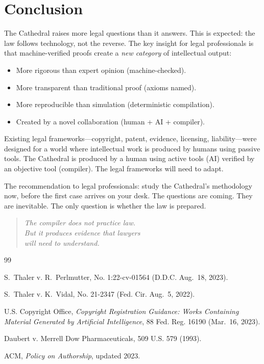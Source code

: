 \documentclass[11pt,a4paper]{article}
\begin{document}
\section{Conclusion}

The Cathedral raises more legal questions than it answers. This is
expected: the law follows technology, not the reverse. The key
insight for legal professionals is that machine-verified proofs
create a \emph{new category} of intellectual output:

\begin{itemize}
  \item More rigorous than expert opinion (machine-checked).
  \item More transparent than traditional proof (axioms named).
  \item More reproducible than simulation (deterministic compilation).
  \item Created by a novel collaboration (human + AI + compiler).
\end{itemize}

Existing legal frameworks---copyright, patent, evidence,
licensing, liability---were designed for a world where intellectual
work is produced by humans using passive tools. The Cathedral is
produced by a human using active tools (AI) verified by an
objective tool (compiler). The legal frameworks will need to adapt.

The recommendation to legal professionals: study the Cathedral's
methodology now, before the first case arrives on your desk.
The questions are coming. They are inevitable. The only question
is whether the law is prepared.

\begin{quote}
\emph{The compiler does not practice law.\\
But it produces evidence that lawyers\\
will need to understand.}
\end{quote}

\begin{thebibliography}{99}

S.~Thaler v. R.~Perlmutter, No. 1:22-cv-01564 (D.D.C. Aug.~18,
2023).

S.~Thaler v. K.~Vidal, No. 21-2347 (Fed. Cir. Aug.~5, 2022).

U.S. Copyright Office, \emph{Copyright Registration Guidance:
Works Containing Material Generated by Artificial Intelligence},
88 Fed. Reg. 16190 (Mar.~16, 2023).

Daubert v. Merrell Dow Pharmaceuticals, 509 U.S. 579 (1993).

ACM, \emph{Policy on Authorship}, updated 2023.

\end{thebibliography}
\end{document}
